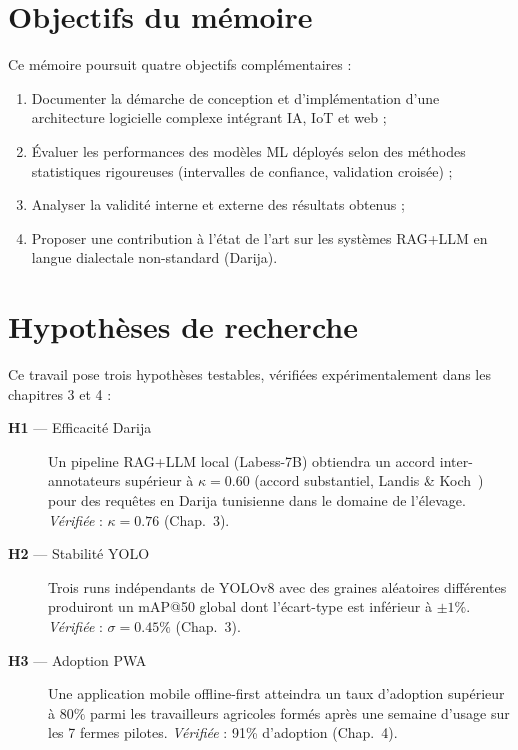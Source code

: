 \documentclass[12pt,a4paper,twoside]{report}
\newcounter{hi}
\begin{document}
\section*{Objectifs du mémoire}
Ce mémoire poursuit quatre objectifs complémentaires :
\begin{enumerate}
  \item Documenter la démarche de conception et d'implémentation d'une
        architecture logicielle complexe intégrant IA, IoT et web ;
  \item Évaluer les performances des modèles ML déployés selon des méthodes
        statistiques rigoureuses (intervalles de confiance, validation croisée) ;
  \item Analyser la validité interne et externe des résultats obtenus ;
  \item Proposer une contribution à l'état de l'art sur les systèmes RAG+LLM
        en langue dialectale non-standard (Darija).
\end{enumerate}

\section*{Hypothèses de recherche}
Ce travail pose trois hypothèses testables, vérifiées expérimentalement dans les
chapitres 3 et 4 :
\begin{description}
  \item[\textbf{H1} — Efficacité Darija] Un pipeline RAG+LLM local (Labess-7B) obtiendra
        un accord inter-annotateurs supérieur à $\kappa = 0.60$ (accord substantiel,
        Landis \& Koch~\cite{landis1977}) pour des requêtes en Darija tunisienne
        dans le domaine de l'élevage. \textit{Vérifiée} : $\kappa = 0.76$ (Chap.~3).
  \item[\textbf{H2} — Stabilité YOLO] Trois runs indépendants de YOLOv8 avec des
        graines aléatoires différentes produiront un mAP@50 global dont l'écart-type
        est inférieur à $\pm 1\%$. \textit{Vérifiée} : $\sigma = 0.45\%$ (Chap.~3).
  \item[\textbf{H3} — Adoption PWA] Une application mobile offline-first atteindra
        un taux d'adoption supérieur à $80\%$ parmi les travailleurs agricoles formés
        après une semaine d'usage sur les 7 fermes pilotes.
        \textit{Vérifiée} : 91\% d'adoption (Chap.~4).
\end{description}
\end{document}

